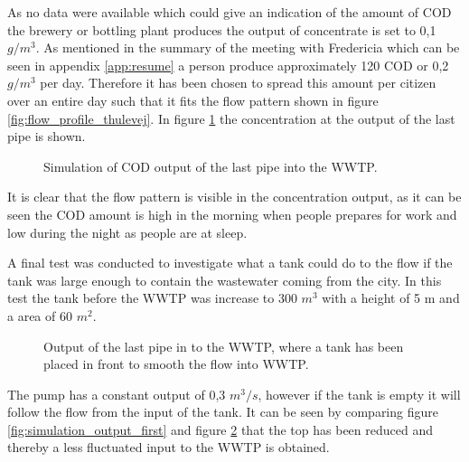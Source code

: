  As no data were available which could give an indication of the amount of COD the brewery or bottling plant produces
the output of concentrate is set to 0,1 $g/m^3$. As mentioned in the summary of the meeting with Fredericia which can be seen in appendix \ref{app:resume} a person produce approximately 120 COD or 0,2 $g/m^3$ per day. 
Therefore it has been chosen to spread this amount per citizen over an entire day such that it fits the flow pattern shown in figure \ref{fig:flow_profile_thulevej}. In figure \ref{fig:simulation_output_first_concentration} the concentration at the output of the last pipe is shown.

\begin{figure}[H]
\centering

\caption{Simulation of COD output of the last pipe into the WWTP.}
\label{fig:simulation_output_first_concentration}
\end{figure}  

It is clear that the flow pattern is visible in the concentration output, as it can be seen the COD amount is high in the morning when people prepares for work and low during the night as people are at sleep.  


A final test was conducted to investigate what a tank could do to the flow if the tank was large enough to contain the wastewater coming from the city. In this test the tank before the WWTP was increase to 300 $m^3$ with a height of 5 m and a area of 60 $m^2$.

\begin{figure}[H]
\centering

\caption{Output of the last pipe in to the WWTP, where a tank has been placed in front to smooth the flow into WWTP.}
\label{fig:simulation_output_second}
\end{figure} 
The pump has a constant output of 0,3 $m^3/s$, however if the tank is empty it will follow the flow from the input of the tank. It can be seen by comparing figure \ref{fig:simulation_output_first} and figure \ref{fig:simulation_output_second} that the top has been reduced and thereby a less fluctuated input to the WWTP is obtained.   
			   